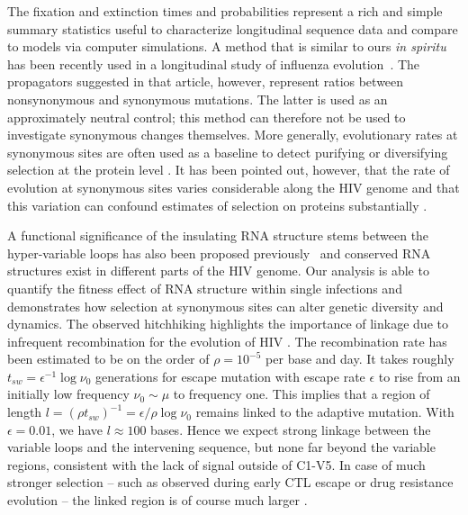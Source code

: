 \documentclass[rmp, twocolumn]{revtex4}
\begin{document}
The fixation and extinction times and probabilities represent a rich and simple
summary statistics useful to characterize longitudinal sequence data and compare
to models via computer simulations. A method that is similar to ours {\it in spiritu}
has been recently used in a longitudinal study of influenza
evolution~\citep{strelkowa_clonal_2012}. The propagators suggested in that
article, however, represent ratios between nonsynonymous and synonymous
mutations.  The latter is used as an approximately neutral control; this method
can therefore not be used to investigate synonymous changes themselves. 
More generally, evolutionary rates at synonymous sites are often used as a
baseline to detect purifying or diversifying selection at the protein level
\cite{Hurst:2002p32608}. It has been pointed out, however, that the rate of
evolution at synonymous sites varies considerable along the HIV genome
\citep{mayrose_towards_2007} and that this variation can confound estimates of
selection on proteins substantially \citep{ngandu_extensive_2008}.


A functional significance of the insulating RNA structure stems between the
hyper-variable loops has also been proposed
previously~\citep{watts_architecture_2009, sanjuan_interplay_2011} and conserved
RNA structures exist in different parts of the HIV genome. Our analysis is able
to quantify the fitness effect of RNA structure within single infections and
demonstrates how selection at synonymous sites can alter genetic diversity and
dynamics. The observed hitchhiking highlights the importance of linkage due to
infrequent recombination for the evolution of HIV
\citep{neher_recombination_2010,batorsky_estimate_2011,
josefsson_majority_2011}. The recombination rate has been estimated to be on the
order of $\rho = 10^{-5}$ per base and day. It takes roughly $t_{sw} =
\epsilon^{-1} \log \nu_0$ generations for escape mutation with escape rate
$\epsilon$ to rise from an initially low frequency $\nu_0\sim \mu$ to frequency
one. This implies that a region of length $l = (\rho t_{sw})^{-1} = \epsilon /
\rho \log \nu_0$ remains linked to the adaptive mutation. With $\epsilon=0.01$,
we have $l\approx 100$ bases. Hence we expect strong linkage between the
variable loops and the intervening sequence, but none far beyond the variable
regions, consistent with the lack of signal outside of C1-V5. In case of much
stronger selection -- such as observed during early CTL escape or drug
resistance evolution -- the linked  region is of course much larger
\citep{nijhuis_stochastic_1998}. 
\end{document}
